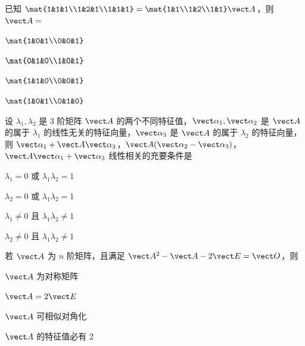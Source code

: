 \begin{question}[index=5]
已知 $\mat{1&1&1\\1&2&1\\1&1&1}=\mat{1&1\\1&2\\1&1}\vect A$，则 $\vect A=$
\begin{choices}[columns=2]
\item $\mat{1&0&1\\0&0&1}$
\item $\mat{0&1&0\\1&0&1}$
\item $\mat{1&1&0\\0&0&1}$
\item $\mat{1&0&1\\0&1&0}$
\end{choices}
\end{question}
\QuestionBreak

\begin{question}[index=6]
设 $\lambda_1,\lambda_2$ 是 $3$ 阶矩阵 $\vect A$ 的两个不同特征值，$\vect\alpha_1,\vect\alpha_2$ 是 $\vect A$ 的属于 $\lambda_1$ 的线性无关的特征向量，$\vect\alpha_3$ 是 $\vect A$ 的属于 $\lambda_2$ 的特征向量，则 $\vect\alpha_1+\vect A\vect\alpha_3$，$\vect A(\vect\alpha_2-\vect\alpha_3)$，$\vect A\vect\alpha_1+\vect\alpha_3$ 线性相关的充要条件是
\begin{choices}[columns=2]
\item $\lambda_1=0$ 或 $\lambda_1\lambda_2=1$
\item $\lambda_2=0$ 或 $\lambda_1\lambda_2=1$
\item $\lambda_1\ne0$ 且 $\lambda_1\lambda_2\ne1$
\item $\lambda_2\ne0$ 且 $\lambda_1\lambda_2\ne1$
\end{choices}
\end{question}
\QuestionBreak

\begin{question}[index=7]
若 $\vect A$ 为 $n$ 阶矩阵，且满足 $\vect A^2-\vect A-2\vect E=\vect O$，则
\begin{choices}[columns=2]
\item $\vect A$ 为对称矩阵
\item $\vect A=2\vect E$
\item $\vect A$ 可相似对角化
\item $\vect A$ 的特征值必有 $2$
\end{choices}
\end{question}
\QuestionBreak

